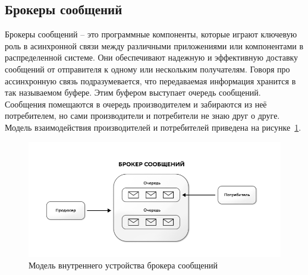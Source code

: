 
\subsection{Брокеры сообщений}\label{subsec:domain:message-brokers}
Брокеры сообщений -- это программные компоненты, которые играют ключевую роль в асинхронной связи между различными приложениями или компонентами в распределенной системе.
Они обеспечивают надежную и эффективную доставку сообщений от отправителя к одному или нескольким получателям.
Говоря про ассинхронную связь подразумевается, что передаваемая информация хранится в так называемом буфере.
Этим буфером выступает очередь сообщений.
Сообщения помещаются в очередь производителем и забираются из неё потребителем, но сами производители и потребители не знаю друг о друге.
Модель взаимодействия производителей и потребителей приведена на рисунке~\ref{fig:domain:mb-interaction-model}.

\begin{figure}[ht]
    \centering
    \includegraphics[width=.6\linewidth]{images/mb_interaction_model}
    \caption{Модель внутреннего устройства брокера сообщений}
    \label{fig:domain:mb-interaction-model}
\end{figure}

